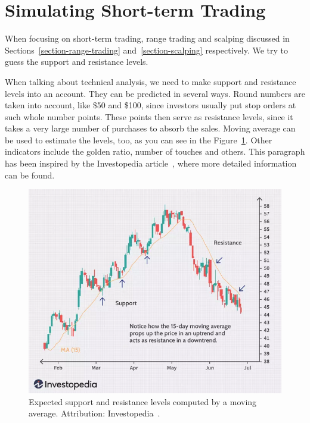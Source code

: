 \section{Simulating Short-term Trading}
\label{section-testing-day-trading}
When focusing on short-term trading, range trading and scalping discussed in Sections~\ref{section-range-trading} and~\ref{section-scalping} respectively. We try to guess the support and resistance levels.

When talking about technical analysis, we need to make support and resistance levels into an account. They can be predicted in several ways. Round numbers are taken into account, like \$50 and \$100, since investors usually put stop orders at such whole number points. These points then serve as resistance levels, since it takes a very large number of purchases to absorb the sales. Moving average can be used to estimate the levels, too, as you can see in the Figure~\ref{figure-ma-support-resistance}. Other indicators include the golden ratio, number of touches and others. This paragraph has been inspired by the Investopedia article~\cite{investopedia:support-and-resistance}, where more detailed information can be found.

\begin{figure}[!hbt]
    \centering
    \includegraphics[width=\columnwidth]{figures/ma-support-resistance.png}
    \caption{Expected support and resistance levels computed by a moving average. Attribution: Investopedia~\cite{investopedia:support-and-resistance}.}
    \label{figure-ma-support-resistance}
\end{figure}

